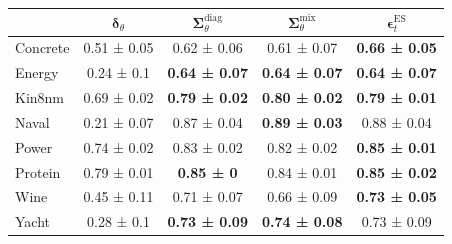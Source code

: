 \begin{tabular}{l|c|c|c|c}
\toprule
 & $\bm\delta_\theta$ & $\bm\Sigma_\theta^{\mathrm{diag}}$ & $\bm\Sigma_\theta^{\mathrm{mix}}$ & $\bm\epsilon_t^\mathrm{ES}$ \\
\midrule
Concrete & 0.51 ± 0.05 & 0.62 ± 0.06 & 0.61 ± 0.07 & \textbf{0.66 ± 0.05} \\
Energy & 0.24 ± 0.1 & \textbf{0.64 ± 0.07} & \textbf{0.64 ± 0.07} & \textbf{0.64 ± 0.07} \\
Kin8nm & 0.69 ± 0.02 & \textbf{0.79 ± 0.02} & \textbf{0.80 ± 0.02} & \textbf{0.79 ± 0.01} \\
Naval & 0.21 ± 0.07 & 0.87 ± 0.04 & \textbf{0.89 ± 0.03} & 0.88 ± 0.04 \\
Power & 0.74 ± 0.02 & 0.83 ± 0.02 & 0.82 ± 0.02 & \textbf{0.85 ± 0.01} \\
Protein & 0.79 ± 0.01 & \textbf{0.85 ± 0} & 0.84 ± 0.01 & \textbf{0.85 ± 0.02} \\
Wine & 0.45 ± 0.11 & 0.71 ± 0.07 & 0.66 ± 0.09 & \textbf{0.73 ± 0.05} \\
Yacht & 0.28 ± 0.1 & \textbf{0.73 ± 0.09} & \textbf{0.74 ± 0.08} & 0.73 ± 0.09 \\
\bottomrule
\end{tabular}
